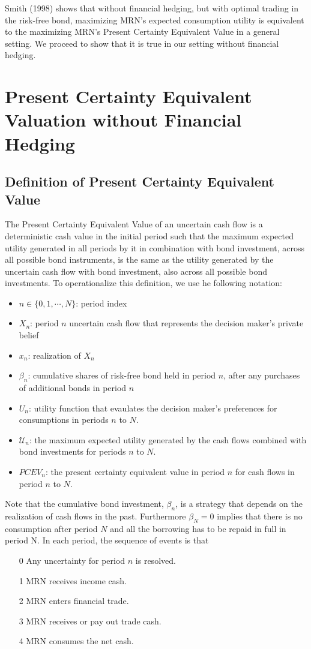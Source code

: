 \documentclass{article}[12pt letter]
\begin{document}
Smith (1998) shows that without financial hedging, but with optimal trading in the risk-free bond, maximizing MRN's expected consumption utility is equivalent to the maximizing  MRN's Present Certainty Equivalent Value in a general setting. We proceed to show that it is true in our setting without financial hedging.

\section{Present Certainty Equivalent Valuation without Financial Hedging}


\subsection{Definition of Present Certainty Equivalent Value}

The Present Certainty Equivalent Value of an uncertain cash flow is a deterministic cash value in the initial period such that  the maximum expected utility generated in all periods by it in combination with bond investment, across all possible bond instruments, is the same as the utility generated by the uncertain cash flow with bond investment, also across all possible bond investments. To operationalize this definition, we use he following notation:
\begin{itemize}
\item $n\in \{0,1, \cdots, N\}$: period index
\item $X_n$: period $n$ uncertain cash flow that represents the decision maker's private belief
\item $x_n$: realization of $X_n$
\item $\beta_n$:  cumulative shares of risk-free bond held in period $n$, after any purchases of additional bonds in period $n$
\item $U_n$: utility function that evaulates the decision maker's preferences for consumptions in periods $n$ to $N$.
\item $\mathcal{U}_n$: the maximum expected utility generated by the cash flows combined with  bond investments for periods $n$ to $N$.
\item $PCEV_n$: the present certainty equivalent value in period $n$ for  cash flows in period $n$ to $N$.
\end{itemize}
Note that the cumulative bond investment, $\beta_n$, is a strategy that depends on the realization of cash flows in the past. Furthermore $\beta_N=0$ implies that there is no consumption after period $N$ and all the borrowing has to be repaid in full in period N. In each period, the sequence of events is that
\begin{itemize}
\item[0] Any uncertainty for period $n$ is resolved.
\item[1] MRN receives income cash.
\item[2] MRN enters financial trade.
\item[3] MRN receives or pay out trade cash.
\item[4] MRN consumes the net cash.
\end{itemize}
\end{document}
